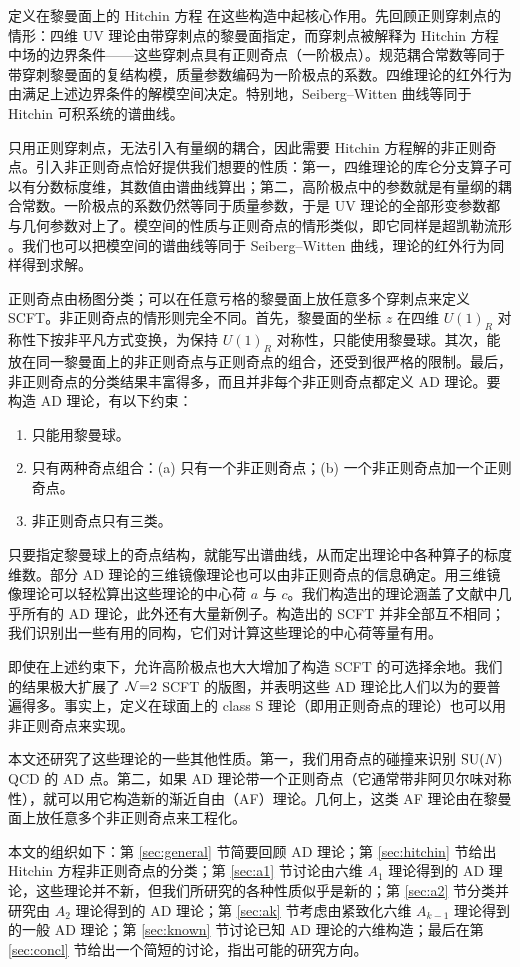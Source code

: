 定义在黎曼面上的 Hitchin 方程 \cite{8,9} 在这些构造中起核心作用。先回顾正则穿刺点的情形：四维 UV 理论由带穿刺点的黎曼面指定，而穿刺点被解释为 Hitchin 方程中场的边界条件——这些穿刺点具有正则奇点（一阶极点）。规范耦合常数等同于带穿刺黎曼面的复结构模，质量参数编码为一阶极点的系数。四维理论的红外行为由满足上述边界条件的解模空间决定。特别地，Seiberg--Witten 曲线等同于 Hitchin 可积系统的谱曲线。

只用正则穿刺点，无法引入有量纲的耦合，因此需要 Hitchin 方程解的非正则奇点。引入非正则奇点恰好提供我们想要的性质：第一，四维理论的库仑分支算子可以有分数标度维，其数值由谱曲线算出；第二，高阶极点中的参数就是有量纲的耦合常数。一阶极点的系数仍然等同于质量参数，于是 UV 理论的全部形变参数都与几何参数对上了。模空间的性质与正则奇点的情形类似，即它同样是超凯勒流形 \cite{10}。我们也可以把模空间的谱曲线等同于 Seiberg--Witten 曲线，理论的红外行为同样得到求解。

正则奇点由杨图分类；可以在任意亏格的黎曼面上放任意多个穿刺点来定义 SCFT。非正则奇点的情形则完全不同。首先，黎曼面的坐标 $z$ 在四维 $U(1)_R$ 对称性下按非平凡方式变换，为保持 $U(1)_R$ 对称性，只能使用黎曼球。其次，能放在同一黎曼面上的非正则奇点与正则奇点的组合，还受到很严格的限制。最后，非正则奇点的分类结果丰富得多，而且并非每个非正则奇点都定义 AD 理论。要构造 AD 理论，有以下约束：
\begin{enumerate}[label=(\arabic*)]
  \item 只能用黎曼球。
  \item 只有两种奇点组合：(a) 只有一个非正则奇点；(b) 一个非正则奇点加一个正则奇点。
  \item 非正则奇点只有三类。
\end{enumerate}

只要指定黎曼球上的奇点结构，就能写出谱曲线，从而定出理论中各种算子的标度维数。部分 AD 理论的三维镜像理论也可以由非正则奇点的信息确定。用三维镜像理论可以轻松算出这些理论的中心荷 $a$ 与 $c$。我们构造出的理论涵盖了文献中几乎所有的 AD 理论，此外还有大量新例子。构造出的 SCFT 并非全部互不相同；我们识别出一些有用的同构，它们对计算这些理论的中心荷等量有用。

即使在上述约束下，允许高阶极点也大大增加了构造 SCFT 的可选择余地。我们的结果极大扩展了 $\mathcal{N}{=}2$ SCFT 的版图，并表明这些 AD 理论比人们以为的要普遍得多。事实上，定义在球面上的 class S 理论（即用正则奇点的理论）也可以用非正则奇点来实现。

本文还研究了这些理论的一些其他性质。第一，我们用奇点的碰撞来识别 $\operatorname{SU}(N)$ QCD 的 AD 点。第二，如果 AD 理论带一个正则奇点（它通常带非阿贝尔味对称性），就可以用它构造新的渐近自由（AF）理论。几何上，这类 AF 理论由在黎曼面上放任意多个非正则奇点来工程化。

本文的组织如下：第 \ref{sec:general} 节简要回顾 AD 理论；第 \ref{sec:hitchin} 节给出 Hitchin 方程非正则奇点的分类；第 \ref{sec:a1} 节讨论由六维 $A_1$ 理论得到的 AD 理论，这些理论并不新，但我们所研究的各种性质似乎是新的；第 \ref{sec:a2} 节分类并研究由 $A_2$ 理论得到的 AD 理论；第 \ref{sec:ak} 节考虑由紧致化六维 $A_{k-1}$ 理论得到的一般 AD 理论；第 \ref{sec:known} 节讨论已知 AD 理论的六维构造；最后在第 \ref{sec:concl} 节给出一个简短的讨论，指出可能的研究方向。
